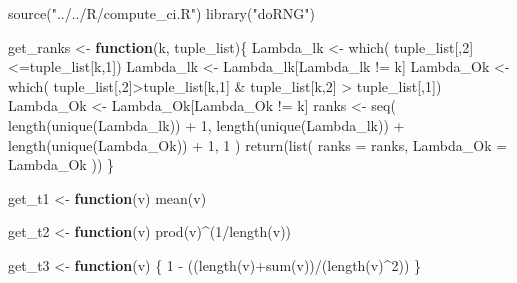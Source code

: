\documentclass[
  12pt,
  a4paper,
]{article}
\newenvironment{Shaded}{\begin{snugshade}}{\end{snugshade}}
\newcommand{\AttributeTok}[1]{\textcolor[rgb]{0.00,0.34,0.68}{#1}}
\newcommand{\ControlFlowTok}[1]{\textcolor[rgb]{0.12,0.11,0.11}{\textbf{#1}}}
\newcommand{\DecValTok}[1]{\textcolor[rgb]{0.69,0.50,0.00}{#1}}
\newcommand{\FunctionTok}[1]{\textcolor[rgb]{0.39,0.29,0.61}{#1}}
\newcommand{\NormalTok}[1]{\textcolor[rgb]{0.12,0.11,0.11}{#1}}
\newcommand{\OtherTok}[1]{\textcolor[rgb]{0.00,0.43,0.16}{#1}}
\newcommand{\SpecialCharTok}[1]{\textcolor[rgb]{0.24,0.68,0.91}{#1}}
\newcommand{\StringTok}[1]{\textcolor[rgb]{0.75,0.01,0.01}{#1}}
\numberwithin{equation}{section}
\begin{document}
\begin{Shaded}
\begin{Highlighting}[]
 \FunctionTok{source}\NormalTok{(}\StringTok{"../../R/compute\_ci.R"}\NormalTok{)}
\FunctionTok{library}\NormalTok{(}\StringTok{"doRNG"}\NormalTok{)}

\NormalTok{get\_ranks }\OtherTok{\textless{}{-}} \ControlFlowTok{function}\NormalTok{(k, tuple\_list)\{}
\NormalTok{  Lambda\_lk }\OtherTok{\textless{}{-}} \FunctionTok{which}\NormalTok{(}
\NormalTok{    tuple\_list[,}\DecValTok{2}\NormalTok{]}\SpecialCharTok{\textless{}=}\NormalTok{tuple\_list[k,}\DecValTok{1}\NormalTok{])}
\NormalTok{  Lambda\_lk }\OtherTok{\textless{}{-}}\NormalTok{ Lambda\_lk[Lambda\_lk }\SpecialCharTok{!=}\NormalTok{ k]}
\NormalTok{  Lambda\_Ok }\OtherTok{\textless{}{-}} \FunctionTok{which}\NormalTok{(}
\NormalTok{    tuple\_list[,}\DecValTok{2}\NormalTok{]}\SpecialCharTok{\textgreater{}}\NormalTok{tuple\_list[k,}\DecValTok{1}\NormalTok{] }\SpecialCharTok{\&}\NormalTok{ tuple\_list[k,}\DecValTok{2}\NormalTok{] }\SpecialCharTok{\textgreater{}}\NormalTok{ tuple\_list[,}\DecValTok{1}\NormalTok{])}
\NormalTok{  Lambda\_Ok }\OtherTok{\textless{}{-}}\NormalTok{ Lambda\_Ok[Lambda\_Ok }\SpecialCharTok{!=}\NormalTok{ k]}
\NormalTok{  ranks }\OtherTok{\textless{}{-}} \FunctionTok{seq}\NormalTok{(}
    \FunctionTok{length}\NormalTok{(}\FunctionTok{unique}\NormalTok{(Lambda\_lk)) }\SpecialCharTok{+} \DecValTok{1}\NormalTok{,}
    \FunctionTok{length}\NormalTok{(}\FunctionTok{unique}\NormalTok{(Lambda\_lk)) }\SpecialCharTok{+} \FunctionTok{length}\NormalTok{(}\FunctionTok{unique}\NormalTok{(Lambda\_Ok)) }\SpecialCharTok{+} \DecValTok{1}\NormalTok{,}
    \DecValTok{1}
\NormalTok{  )}
  \FunctionTok{return}\NormalTok{(}\FunctionTok{list}\NormalTok{(}
    \AttributeTok{ranks =}\NormalTok{ ranks,}
    \AttributeTok{Lambda\_Ok =}\NormalTok{ Lambda\_Ok}
\NormalTok{  ))}
\NormalTok{\}}

\NormalTok{get\_t1 }\OtherTok{\textless{}{-}} \ControlFlowTok{function}\NormalTok{(v) }\FunctionTok{mean}\NormalTok{(v)}

\NormalTok{get\_t2 }\OtherTok{\textless{}{-}} \ControlFlowTok{function}\NormalTok{(v) }\FunctionTok{prod}\NormalTok{(v)}\SpecialCharTok{\^{}}\NormalTok{(}\DecValTok{1}\SpecialCharTok{/}\FunctionTok{length}\NormalTok{(v))}

\NormalTok{get\_t3 }\OtherTok{\textless{}{-}} \ControlFlowTok{function}\NormalTok{(v) \{}
  \DecValTok{1} \SpecialCharTok{{-}}\NormalTok{ ((}\FunctionTok{length}\NormalTok{(v)}\SpecialCharTok{+}\FunctionTok{sum}\NormalTok{(v))}\SpecialCharTok{/}\NormalTok{(}\FunctionTok{length}\NormalTok{(v)}\SpecialCharTok{\^{}}\DecValTok{2}\NormalTok{))}
\NormalTok{\}}


\end{Highlighting}
\end{Shaded}
\end{document}

